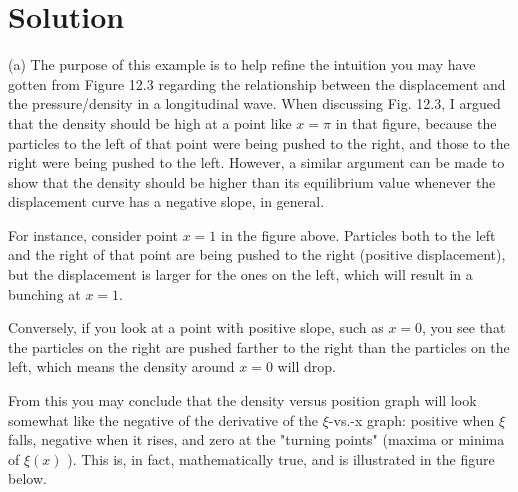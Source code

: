 \documentclass[10pt]{article}
\begin{document}
\section*{Solution}
(a) The purpose of this example is to help refine the intuition you may have gotten from Figure 12.3 regarding the relationship between the displacement and the pressure/density in a longitudinal wave. When discussing Fig. 12.3, I argued that the density should be high at a point like $x=\pi$ in that figure, because the particles to the left of that point were being pushed to the right, and those to the right were being pushed to the left. However, a similar argument can be made to show that the density should be higher than its equilibrium value whenever the displacement curve has a negative slope, in general.

For instance, consider point $x=1$ in the figure above. Particles both to the left and the right of that point are being pushed to the right (positive displacement), but the displacement is larger for the ones on the left, which will result in a bunching at $x=1$.

Conversely, if you look at a point with positive slope, such as $x=0$, you see that the particles on the right are pushed farther to the right than the particles on the left, which means the density around $x=0$ will drop.

From this you may conclude that the density versus position graph will look somewhat like the negative of the derivative of the $\xi$-vs.-x graph: positive when $\xi$ falls, negative when it rises, and zero at the "turning points" (maxima or minima of $\xi(x)$ ). This is, in fact, mathematically true, and is illustrated in the figure below.
\end{document}
